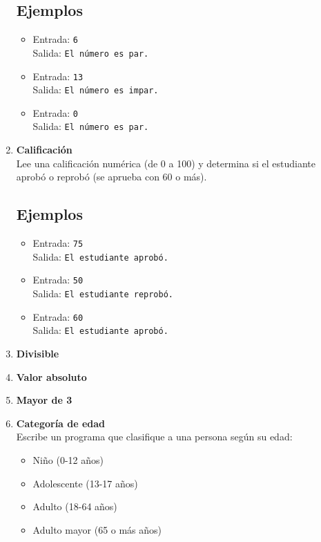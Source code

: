 \begin{enumerate}
    \subsection*{Ejemplos}
    \begin{itemize}
        \item Entrada: \texttt{6}\\
              Salida: \texttt{El número es par.}
        \item Entrada: \texttt{13}\\
              Salida: \texttt{El número es impar.}
        \item Entrada: \texttt{0}\\
              Salida: \texttt{El número es par.}
    \end{itemize}

    \item \textbf{Calificación}\\
    Lee una calificación numérica (de 0 a 100) y determina si el estudiante aprobó o reprobó (se aprueba con 60 o más).
    \subsection*{Ejemplos}
    \begin{itemize}
        \item Entrada: \texttt{75}\\
              Salida: \texttt{El estudiante aprobó.}
        \item Entrada: \texttt{50}\\
              Salida: \texttt{El estudiante reprobó.}
        \item Entrada: \texttt{60}\\
              Salida: \texttt{El estudiante aprobó.}
    \end{itemize}
    
    \item \textbf{Divisible}\\
    

    \item \textbf{Valor absoluto}\\
    

    \item \textbf{Mayor de 3}\\
    

    \item \textbf{Categoría de edad}\\
    Escribe un programa que clasifique a una persona según su edad:
    \begin{itemize}
        \item Niño (0-12 años)
        \item Adolescente (13-17 años)
        \item Adulto (18-64 años)
        \item Adulto mayor (65 o más años)
    \end{itemize}

\end{enumerate}
